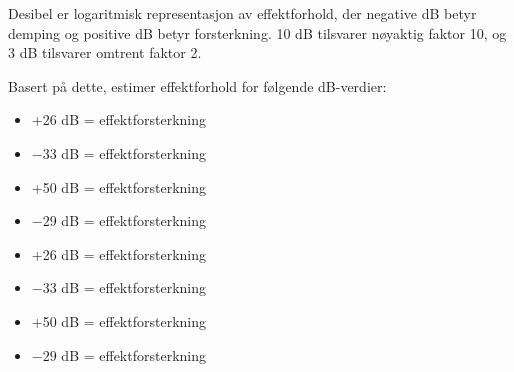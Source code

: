 

Desibel er logaritmisk representasjon av effektforhold, der negative dB betyr demping og positive dB betyr forsterkning. 10 dB tilsvarer nøyaktig faktor 10, og 3 dB tilsvarer omtrent faktor 2.

\vskip 10pt

Basert på dette, estimer effektforhold for følgende dB-verdier:

\begin{itemize}
\item{} +26 dB = effektforsterkning \underbar{\hskip 50pt}
\vskip 5pt
\item{} $-33$ dB = effektforsterkning \underbar{\hskip 50pt}
\vskip 5pt
\item{} +50 dB = effektforsterkning \underbar{\hskip 50pt}
\vskip 5pt
\item{} $-29$ dB = effektforsterkning \underbar{\hskip 50pt}
\vskip 5pt
\end{itemize}







\begin{itemize}
\item{} +26 dB = effektforsterkning 
\vskip 5pt
\item{} $-33$ dB = effektforsterkning 
\vskip 5pt
\item{} +50 dB = effektforsterkning 
\vskip 5pt
\item{} $-29$ dB = effektforsterkning 
\vskip 5pt
\end{itemize}










